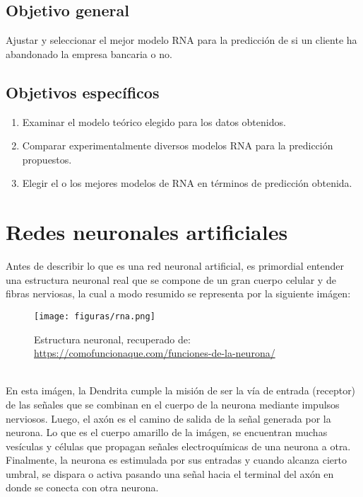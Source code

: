 \documentclass{report}
\begin{document}
\section{Objetivo general}\label{objetivo general}
Ajustar y seleccionar el mejor modelo RNA para la predicción de si un cliente ha abandonado la empresa bancaria o no.

\section{Objetivos específicos}\label{objetivos específicos}
\begin{enumerate}
\item Examinar el modelo teórico elegido para los datos obtenidos. 
\item Comparar experimentalmente diversos modelos RNA para la predicción propuestos.
\item Elegir el o los mejores modelos de RNA en términos de predicción obtenida.
\end{enumerate}
\chapter{Redes neuronales artificiales}
Antes de describir lo que es una red neuronal artificial, es primordial entender una estructura neuronal real que se compone de un gran cuerpo celular y de fibras nerviosas, la cual a modo resumido se representa por la siguiente imágen:\\
\begin{figure}[htp]
        \centering
    	\texttt{[image: figuras/rna.png]}
    	\label{fig: Figura1}
    	\caption{Estructura neuronal, recuperado de: \url{https://comofuncionaque.com/funciones-de-la-neurona/}}
        \end{figure}\\

En esta imágen, la Dendrita cumple la misión de ser la vía de entrada (receptor) de las señales que se combinan en el cuerpo de la neurona mediante impulsos nerviosos. Luego, el axón es el camino de salida de la señal generada por la neurona. Lo que es el cuerpo amarillo de la imágen, se encuentran muchas vesículas y células que propagan señales electroquímicas de una neurona a otra. Finalmente, la neurona es estimulada por sus entradas y cuando alcanza cierto umbral, se dispara o activa pasando una señal hacia el terminal del axón en donde se conecta con otra neurona.\\
\end{document}
